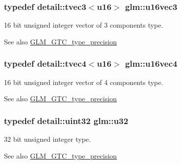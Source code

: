 \subsubsection[{u16vec3}]{\setlength{\rightskip}{0pt plus 5cm}typedef detail\+::tvec3$<$u16$>$ {\bf glm\+::u16vec3}}\label{group__gtc__type__precision_gadce584ceb1de400c392cb2df1b343df9}
16 bit unsigned integer vector of 3 components type. \begin{DoxySeeAlso}{See also}
\hyperlink{group__gtc__type__precision}{G\+L\+M\+\_\+\+G\+T\+C\+\_\+type\+\_\+precision} 
\end{DoxySeeAlso}
\hypertarget{group__gtc__type__precision_ga0144c89f52e4b5ca057f5349cdd80bf2}{}
\subsubsection[{u16vec4}]{\setlength{\rightskip}{0pt plus 5cm}typedef detail\+::tvec4$<$u16$>$ {\bf glm\+::u16vec4}}\label{group__gtc__type__precision_ga0144c89f52e4b5ca057f5349cdd80bf2}
16 bit unsigned integer vector of 4 components type. \begin{DoxySeeAlso}{See also}
\hyperlink{group__gtc__type__precision}{G\+L\+M\+\_\+\+G\+T\+C\+\_\+type\+\_\+precision} 
\end{DoxySeeAlso}
\hypertarget{group__gtc__type__precision_ga54e837745059fd29017bed71cfa0a8db}{}
\subsubsection[{u32}]{\setlength{\rightskip}{0pt plus 5cm}typedef detail\+::uint32 {\bf glm\+::u32}}\label{group__gtc__type__precision_ga54e837745059fd29017bed71cfa0a8db}
32 bit unsigned integer type. \begin{DoxySeeAlso}{See also}
\hyperlink{group__gtc__type__precision}{G\+L\+M\+\_\+\+G\+T\+C\+\_\+type\+\_\+precision} 
\end{DoxySeeAlso}
\hypertarget{group__gtc__type__precision_ga690033f989275bb90f793a785dc45521}{}
